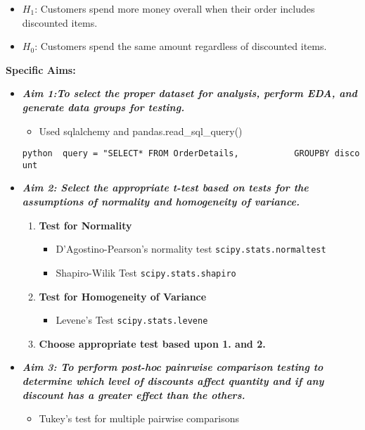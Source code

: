 \documentclass[11pt]{article}
\providecommand{\tightlist}{%
      \setlength{\itemsep}{0pt}\setlength{\parskip}{0pt}}
\begin{document}
\begin{itemize}
\item
  \(H_1\): Customers spend more money overall when their order includes
  discounted items.
\item
  \(H_0\): Customers spend the same amount regardless of discounted
  items.
\end{itemize}

\textbf{Specific Aims:}

\begin{itemize}
\item
  \textbf{\emph{Aim 1:To select the proper dataset for analysis, perform
  EDA, and generate data groups for testing.}}

  \begin{itemize}
  \tightlist
  \item
    Used sqlalchemy and pandas.read\_sql\_query()
  \end{itemize}

  \texttt{python\ \ query\ =\ "SELECT*\ FROM\ OrderDetails,\ \ \ \ \ \ \ \ \ \ \ GROUPBY\ discount}
\item
  \textbf{\emph{Aim 2: Select the appropriate t-test based on tests for
  the assumptions of normality and homogeneity of variance.}}

  \begin{enumerate}
  \def\labelenumi{\arabic{enumi}.}
  \tightlist
  \item
    \textbf{Test for Normality}

    \begin{itemize}
    \tightlist
    \item
      D'Agostino-Pearson's normality test
      \texttt{scipy.stats.normaltest}
    \item
      Shapiro-Wilik Test \texttt{scipy.stats.shapiro}
    \end{itemize}
  \item
    \textbf{Test for Homogeneity of Variance}

    \begin{itemize}
    \tightlist
    \item
      Levene's Test \texttt{scipy.stats.levene}
    \end{itemize}
  \item
    \textbf{Choose appropriate test based upon 1. and 2.} 
  \end{enumerate}
\item
  \textbf{\emph{Aim 3: To perform post-hoc painrwise comparison testing
  to determine which level of discounts affect quantity and if any
  discount has a greater effect than the others.}}

  \begin{itemize}
  \tightlist
  \item
    Tukey's test for multiple pairwise comparisons
  \end{itemize}
\end{itemize}
\end{document}
